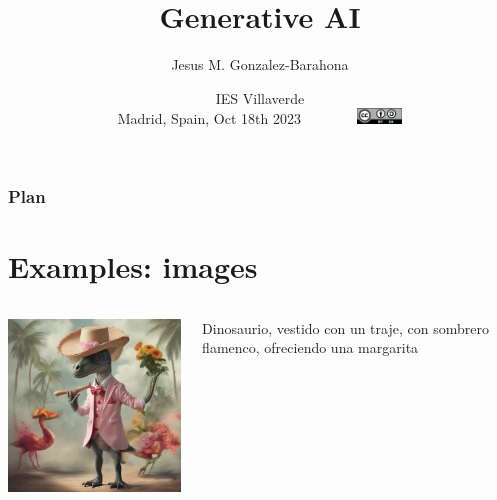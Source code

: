 \documentclass[17pt,aspectratio=169,hyperref={pdfusetitle,colorlinks,allcolors=olive}]{beamer}
\title[Generative AI]{Generative AI}
\author[Jesus M. Gonzalez-Barahona]{Jesus M. Gonzalez-Barahona}
\institute[URJC]{Universidad Rey Juan Carlos \\
  \url{https://floss.social/@jgbarah} ~~~~~ \url{https://jgbarah.github.io/presentations}}
\date[October 2023]{\small IES Villaverde \\
  Madrid, Spain, Oct 18th 2023~~~~~~~~\includegraphics[width=1.2cm]{figs/by-sa}}
\begin{document}
\begin{frame}
  \maketitle
\end{frame}



\begin{frame}
  \frametitle{Plan}
\tableofcontents
\end{frame}


\section{Examples: images}

\begin{frame}[fragile]

    \begin{columns}[T]
    \begin{column}{.58\textwidth}
        \includegraphics[width=7.5cm]{figs/sdxl-dinosaurio}
    \end{column}%
    \hfill%
    \begin{column}{.38\textwidth}
      Dinosaurio, vestido con un traje,  con sombrero flamenco, ofreciendo una margarita
    \end{column}%
  \end{columns}

\end{frame}
\end{document}
